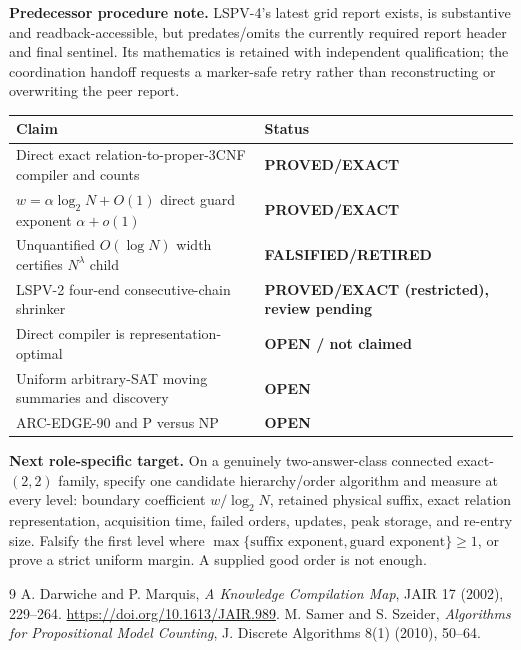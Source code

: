 \documentclass[11pt]{article}
\begin{document}
\textbf{Predecessor procedure note.}  LSPV-4's latest grid report exists,
is substantive and readback-accessible, but predates/omits the currently
required report header and final sentinel.  Its mathematics is retained with
independent qualification; the coordination handoff requests a marker-safe
retry rather than reconstructing or overwriting the peer report.

\begin{center}\begin{tabular}{p{.58\linewidth}p{.30\linewidth}}
\toprule Claim & Status\\\midrule
Direct exact relation-to-proper-3CNF compiler and counts & \textbf{PROVED/EXACT}\\
$w=\alpha\log_2N+O(1)$ direct guard exponent $\alpha+o(1)$ & \textbf{PROVED/EXACT}\\
Unquantified $O(\log N)$ width certifies $N^\lambda$ child & \textbf{FALSIFIED/RETIRED}\\
LSPV-2 four-end consecutive-chain shrinker & \textbf{PROVED/EXACT (restricted), review pending}\\
Direct compiler is representation-optimal & \textbf{OPEN / not claimed}\\
Uniform arbitrary-SAT moving summaries and discovery & \textbf{OPEN}\\
ARC-EDGE-90 and P versus NP & \textbf{OPEN}\\\bottomrule
\end{tabular}\end{center}

\textbf{Next role-specific target.}  On a genuinely two-answer-class connected
exact-$(2,2)$ family, specify one candidate hierarchy/order algorithm and
measure at every level: boundary coefficient $w/\log_2N$, retained physical
suffix, exact relation representation, acquisition time, failed orders,
updates, peak storage, and re-entry size.  Falsify the first level where
$\max\{\text{suffix exponent},\text{guard exponent}\}\ge1$, or prove a
strict uniform margin.  A supplied good order is not enough.

\begin{thebibliography}{9}
 A. Darwiche and P. Marquis,
\emph{A Knowledge Compilation Map}, JAIR 17 (2002), 229--264.
\url{https://doi.org/10.1613/JAIR.989}.
 M. Samer and S. Szeider,
\emph{Algorithms for Propositional Model Counting}, J. Discrete Algorithms
8(1) (2010), 50--64.
\end{thebibliography}

\end{document}
